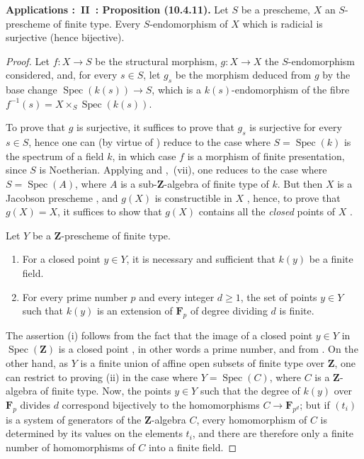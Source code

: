 \begin{env}[10.4.11]
\label{IV.10.4.11}
\textbf{Applications :~II~: Proposition (10.4.11).}
Let $S$ be a prescheme, $X$ an $S$-prescheme of finite type.
Every $S$-endomorphism of $X$ which is radicial is surjective (hence bijective).
\end{env}

\begin{proof}
Let $f:X\to S$ be the structural morphism, $g:X\to X$ the $S$-endomorphism considered, and, for every $s\in S$, let $g_s$ be the morphism deduced from $g$ by the base change $\operatorname{Spec}(k(s))\to S$, which is a $k(s)$-endomorphism of the fibre $f^{-1}(s)=X\times_S\operatorname{Spec}(k(s))$.

To prove that $g$ is surjective, it suffices to prove that $g_s$ is surjective for every $s\in S$, hence one can (by virtue of ) reduce to the case where $S=\operatorname{Spec}(k)$ is the spectrum of a field $k$, in which case $f$ is a morphism of finite presentation, since $S$ is Noetherian.
Applying  and ,~(vii), one reduces to the case where $S=\operatorname{Spec}(A)$, where $A$ is a sub-$\mathbf{Z}$-algebra of finite type of $k$.
But then $X$ is a Jacobson prescheme , and $g(X)$ is constructible in $X$ , hence, to prove that $g(X)=X$, it suffices to show that $g(X)$ contains all the \emph{closed} points of $X$ .

\begin{lemma}[10.4.11.1]
\label{IV.10.4.11.1}
Let $Y$ be a $\mathbf{Z}$-prescheme of finite type.
\begin{enumerate}[label=(\roman*)]
  \item For a closed point $y\in Y$, it is necessary and sufficient that $k(y)$ be a finite field.
  \item For every prime number $p$ and every integer $d\geq 1$, the set of points $y\in Y$ such that $k(y)$ is an extension of $\mathbf{F}_p$ of degree dividing $d$ is finite.
\end{enumerate}
\end{lemma}

The assertion (i) follows from the fact that the image of a closed point $y\in Y$ in $\operatorname{Spec}(\mathbf{Z})$ is a closed point , in other words a prime number, and from .
On the other hand, as $Y$ is a finite union of affine open subsets of finite type over $\mathbf{Z}$, one can restrict to proving (ii) in the case where $Y=\operatorname{Spec}(C)$, where $C$ is a $\mathbf{Z}$-algebra of finite type.
Now, the points $y\in Y$ such that the degree of $k(y)$ over $\mathbf{F}_p$ divides $d$ correspond bijectively to the homomorphisms $C\to\mathbf{F}_{p^d}$; but if $(t_i)$ is a system of generators of the $\mathbf{Z}$-algebra $C$, every homomorphism of $C$ is determined by its values on the elements $t_i$, and there are therefore only a finite number of homomorphisms of $C$ into a finite field.


\end{proof}
